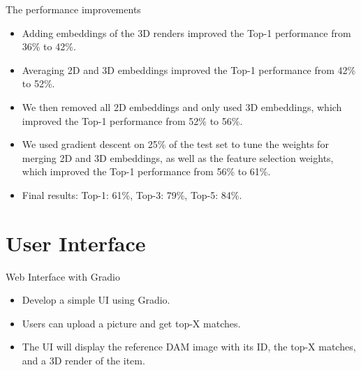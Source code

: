 \documentclass{beamer}
\begin{document}
\begin{frame}{The performance improvements}
    \begin{itemize}
        \item Adding embeddings of the 3D renders improved the Top-1 performance from 36\% to 42\%.
        \item Averaging 2D and 3D embeddings improved the Top-1 performance from 42\% to 52\%.
        \item We then removed all 2D embeddings and only used 3D embeddings, which improved the Top-1 performance from 52\% to 56\%.
        \item We used gradient descent on 25\% of the test set to tune the weights for merging 2D and 3D embeddings, as well as the feature selection weights, which improved the Top-1 performance from 56\% to 61\%.
        \item Final results: Top-1: 61\%, Top-3: 79\%, Top-5: 84\%.
    \end{itemize}
\end{frame}

\section{User Interface}
\begin{frame}{Web Interface with Gradio}
\begin{itemize}
    \item Develop a simple UI using Gradio.
    \item Users can upload a picture and get top-X matches.
    \item The UI will display the reference DAM image with its ID, the top-X matches, and a 3D render of the item.
\end{itemize}
\end{frame}
\end{document}
